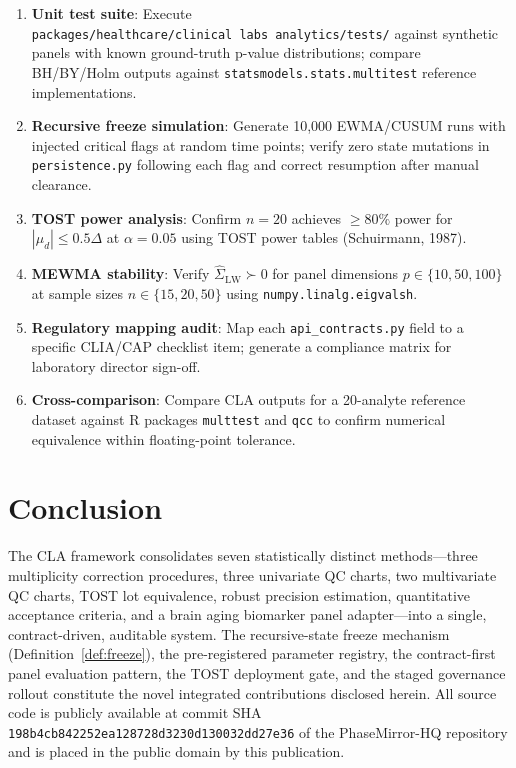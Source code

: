 \documentclass[11pt,a4paper]{article}
\begin{document}
\begin{enumerate}
  \item \textbf{Unit test suite}: Execute
        \texttt{packages/healthcare/clinical~labs~analytics/tests/} against
        synthetic panels with known ground-truth p-value distributions; compare
        BH/BY/Holm outputs against \texttt{statsmodels.stats.multitest}
        reference implementations.

  \item \textbf{Recursive freeze simulation}: Generate 10{,}000 EWMA/CUSUM
        runs with injected critical flags at random time points; verify
        zero state mutations in \texttt{persistence.py} following each flag and
        correct resumption after manual clearance.

  \item \textbf{TOST power analysis}: Confirm $n = 20$ achieves $\ge 80\%$
        power for $|\mu_d| \le 0.5\Delta$ at $\alpha = 0.05$ using TOST power
        tables (Schuirmann, 1987).

  \item \textbf{MEWMA stability}: Verify
        $\hat{\Sigma}_{\mathrm{LW}} \succ 0$ for panel dimensions
        $p \in \{10, 50, 100\}$ at sample sizes $n \in \{15, 20, 50\}$
        using \texttt{numpy.linalg.eigvalsh}.

  \item \textbf{Regulatory mapping audit}: Map each \texttt{api\_contracts.py}
        field to a specific CLIA/CAP checklist item; generate a compliance
        matrix for laboratory director sign-off.

  \item \textbf{Cross-comparison}: Compare CLA outputs for a 20-analyte
        reference dataset against R packages \texttt{multtest} and \texttt{qcc}
        to confirm numerical equivalence within floating-point tolerance.
\end{enumerate}

\section{Conclusion}
\label{sec:conclusion}

The CLA framework consolidates seven statistically distinct methods---three
multiplicity correction procedures, three univariate QC charts, two multivariate
QC charts, TOST lot equivalence, robust precision estimation, quantitative
acceptance criteria, and a brain aging biomarker panel adapter---into a single,
contract-driven, auditable system. The recursive-state freeze mechanism
(Definition~\ref{def:freeze}), the pre-registered parameter registry, the
contract-first panel evaluation pattern, the TOST deployment gate, and the
staged governance rollout constitute the novel integrated contributions disclosed
herein. All source code is publicly available at commit SHA
\texttt{198b4cb842252ea128728d3230d130032dd27e36} of the PhaseMirror-HQ
repository and is placed in the public domain by this publication.
\end{document}

